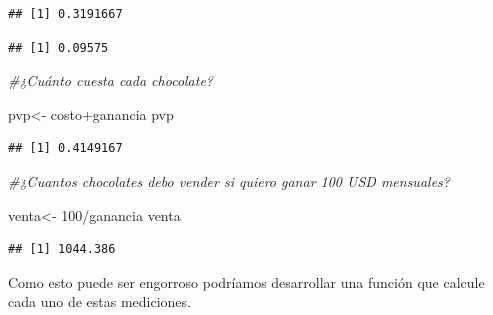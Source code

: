 \documentclass[]{article}
\newenvironment{Shaded}{\begin{snugshade}}{\end{snugshade}}
\newcommand{\DecValTok}[1]{\textcolor[rgb]{0.00,0.00,0.81}{{#1}}}
\newcommand{\FloatTok}[1]{\textcolor[rgb]{0.00,0.00,0.81}{{#1}}}
\newcommand{\StringTok}[1]{\textcolor[rgb]{0.31,0.60,0.02}{{#1}}}
\newcommand{\CommentTok}[1]{\textcolor[rgb]{0.56,0.35,0.01}{\textit{{#1}}}}
\newcommand{\NormalTok}[1]{{#1}}
\begin{document}
\begin{verbatim}
## [1] 0.3191667
\end{verbatim}

\begin{Shaded}
\end{Shaded}

\begin{verbatim}
## [1] 0.09575
\end{verbatim}

\begin{Shaded}
\begin{Highlighting}[]
\CommentTok{#¿Cuánto cuesta cada chocolate?}

\NormalTok{pvp<-}\StringTok{ }\NormalTok{costo+ganancia}
\NormalTok{pvp}
\end{Highlighting}
\end{Shaded}

\begin{verbatim}
## [1] 0.4149167
\end{verbatim}

\begin{Shaded}
\begin{Highlighting}[]
\CommentTok{#¿Cuantos chocolates debo vender si quiero ganar 100 USD mensuales?}

\NormalTok{venta<-}\StringTok{ }\DecValTok{100}\NormalTok{/ganancia}
\NormalTok{venta}
\end{Highlighting}
\end{Shaded}

\begin{verbatim}
## [1] 1044.386
\end{verbatim}

Como esto puede ser engorroso podríamos desarrollar una función que
calcule cada uno de estas mediciones.
\end{document}

